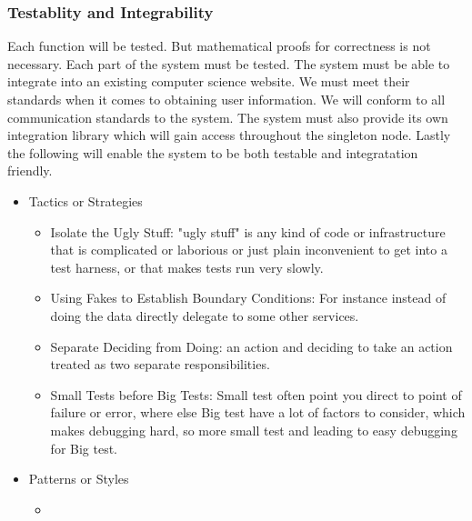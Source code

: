 \subsubsection{Testablity and Integrability}
		Each function will be tested. But mathematical proofs for correctness is not necessary. Each part of the system must be tested. The system must be able to integrate into an existing computer science website. We must meet their standards when it comes to obtaining user information. We will conform to all communication standards to the system. The system must also provide its own integration library which will gain access throughout the singleton node. Lastly the following will enable the system to be both testable and integratation friendly.
		\begin{itemize}
	\item{Tactics or Strategies}
		\begin{itemize}
			\item Isolate the Ugly Stuff: "ugly stuff" is any kind of code or infrastructure that is complicated or laborious or just plain inconvenient to get into a test harness, or that makes tests run very slowly.
			\item Using Fakes to Establish Boundary Conditions: For instance instead of doing the data directly delegate to some other services.
			\item Separate Deciding from Doing: an action and deciding to take an action treated as two separate responsibilities.
			\item Small Tests before Big Tests: Small test often point you direct to point of failure or error, where else Big test have a lot of factors to consider, which makes debugging hard, so more small test and leading to easy debugging for Big test.
		\end{itemize}
	\item{Patterns or Styles}
		\begin{itemize}
			\item
		\end{itemize}
\end{itemize}

%
